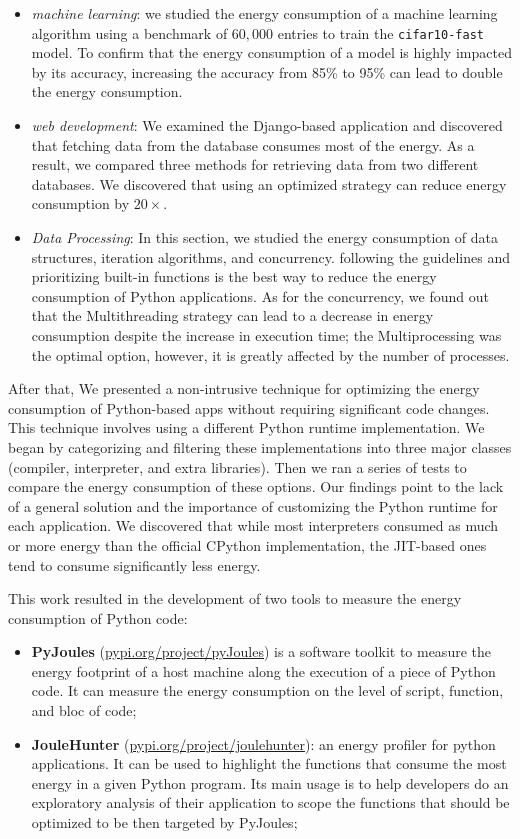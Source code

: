 \begin{itemize}
      \item \emph{machine learning}:  we studied the energy consumption of a machine learning algorithm using a benchmark of $60,000$ entries to train the \texttt{cifar10-fast} model. To confirm that the energy consumption of a model is highly impacted by its accuracy, increasing the accuracy from 85\% to 95\% can lead to double the energy consumption.
      \item \emph{web development}: We examined the Django-based application and discovered that fetching data from the database consumes most of the energy. As a result, we compared three methods for retrieving data from two different databases. We discovered that using an optimized strategy can reduce energy consumption by $20\times$.
      \item \emph{Data Processing}: In this section, we studied the energy consumption of data structures, iteration algorithms, and concurrency.  following the guidelines and prioritizing built-in functions is the best way to reduce the energy consumption of Python applications.
      As for the concurrency, we found out that the \textsf{Multithreading} strategy can lead to a decrease in energy consumption despite the increase in execution time; the \textsf{Multiprocessing} was the optimal option, however, it is greatly affected by the number of processes.
\end{itemize}
After that, We presented a non-intrusive technique for optimizing the energy consumption of Python-based apps without requiring significant code changes.
This technique involves using a different Python runtime implementation.
We began by categorizing and filtering these implementations into three major classes (compiler, interpreter, and extra libraries).
Then we ran a series of tests to compare the energy consumption of these options.
Our findings point to the lack of a general solution and the importance of customizing the Python runtime for each application.
We discovered that while most interpreters consumed as much or more energy than the official CPython implementation, the JIT-based ones tend to consume significantly less energy.

This work resulted in the development of two tools to measure the energy consumption of Python code: 
\begin{itemize}
      \item \textbf{PyJoules} (\url{pypi.org/project/pyJoules}) is a software toolkit to measure the energy footprint of a host machine along the execution of a piece of Python code. It can measure the energy consumption on the level of script, function, and bloc of code;
      \item \textbf{JouleHunter} (\url{pypi.org/project/joulehunter}): an energy profiler for python applications. It can be used to highlight the functions that consume the most energy in a given Python program. Its main usage is to help developers do an exploratory analysis of their application to scope the functions that should be optimized to be then targeted by PyJoules;
     \end{itemize}


